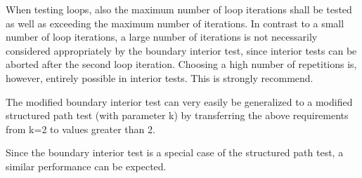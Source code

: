 \documentclass[master,english,smartquotes,apa]{hgbthesis}
\begin{document}
	When testing loops, also the maximum number of loop iterations shall be tested as well as exceeding the maximum number of iterations. In contrast to a small number of loop iterations, a large number of iterations is not necessarily considered appropriately by the boundary interior test, since interior tests can be aborted after the second loop iteration. Choosing a high number of repetitions is, however, entirely possible in interior tests. This is strongly recommend.

	The modified boundary interior test can very easily be generalized to a modified structured path test (with parameter k) by transferring the above requirements from k=2 to values greater than 2.

	Since the boundary interior test is a special case of the structured path test, a similar performance can be expected.


	
	
\end{document}
